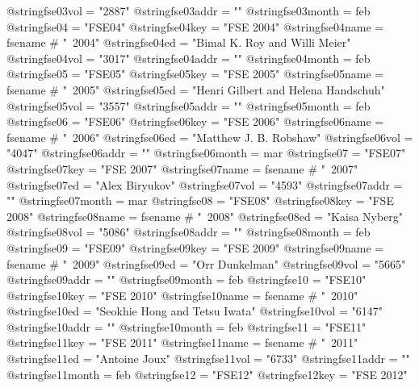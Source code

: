 @string{fse03vol =              "2887"}
@string{fse03addr =             ""}
@string{fse03month =            feb}
@string{fse04 =                 "FSE04"}
@string{fse04key =              "FSE 2004"}
@string{fse04name =             fsename # "~2004"}
@string{fse04ed =               "Bimal K. Roy and Willi Meier"}
@string{fse04vol =              "3017"}
@string{fse04addr =             ""}
@string{fse04month =            feb}
@string{fse05 =                 "FSE05"}
@string{fse05key =              "FSE 2005"}
@string{fse05name =             fsename # "~2005"}
@string{fse05ed =               "Henri Gilbert and Helena Handschuh"}
@string{fse05vol =              "3557"}
@string{fse05addr =             ""}
@string{fse05month =            feb}
@string{fse06 =                 "FSE06"}
@string{fse06key =              "FSE 2006"}
@string{fse06name =             fsename # "~2006"}
@string{fse06ed =               "Matthew J. B. Robshaw"}
@string{fse06vol =              "4047"}
@string{fse06addr =             ""}
@string{fse06month =            mar}
@string{fse07 =                 "FSE07"}
@string{fse07key =              "FSE 2007"}
@string{fse07name =             fsename # "~2007"}
@string{fse07ed =               "Alex Biryukov"}
@string{fse07vol =              "4593"}
@string{fse07addr =             ""}
@string{fse07month =            mar}
@string{fse08 =                 "FSE08"}
@string{fse08key =              "FSE 2008"}
@string{fse08name =             fsename # "~2008"}
@string{fse08ed =               "Kaisa Nyberg"}
@string{fse08vol =              "5086"}
@string{fse08addr =             ""}
@string{fse08month =            feb}
@string{fse09 =                 "FSE09"}
@string{fse09key =              "FSE 2009"}
@string{fse09name =             fsename # "~2009"}
@string{fse09ed =               "Orr Dunkelman"}
@string{fse09vol =              "5665"}
@string{fse09addr =             ""}
@string{fse09month =            feb}
@string{fse10 =                 "FSE10"}
@string{fse10key =              "FSE 2010"}
@string{fse10name =             fsename # "~2010"}
@string{fse10ed =               "Seokhie Hong and Tetsu Iwata"}
@string{fse10vol =              "6147"}
@string{fse10addr =             ""}
@string{fse10month =            feb}
@string{fse11 =                 "FSE11"}
@string{fse11key =              "FSE 2011"}
@string{fse11name =             fsename # "~2011"}
@string{fse11ed =               "Antoine Joux"}
@string{fse11vol =              "6733"}
@string{fse11addr =             ""}
@string{fse11month =            feb}
@string{fse12 =                 "FSE12"}
@string{fse12key =              "FSE 2012"}
